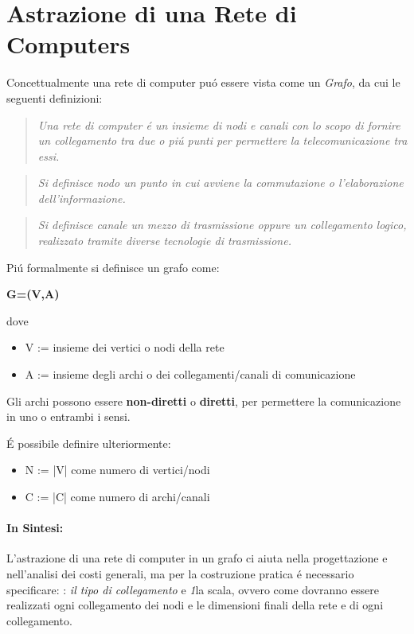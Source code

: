 \documentclass[12pt]{article}
\begin{document}
\clearpage
\section{Astrazione di una Rete di Computers}\label{astrazione-di-una-rete-di-computers}
Concettualmente una rete di computer pu\'o essere vista come un \textit{Grafo}, da cui le seguenti definizioni:
\begin{quote}
	\textit{Una rete di computer \'e un insieme di nodi e canali con lo scopo di fornire un collegamento tra due o pi\'u punti
	per permettere la telecomunicazione tra essi.}
\end{quote}

\begin{quote}
	\textit{Si definisce nodo un punto in cui avviene la commutazione o l'elaborazione dell'informazione.}
\end{quote}

\begin{quote}
	\textit{Si definisce canale un mezzo di trasmissione oppure un collegamento logico, realizzato tramite diverse tecnologie di 
	trasmissione.}
\end{quote}
Pi\'u formalmente si definisce un grafo come:
\begin{center}
	\textbf{G=(V,A)}
\end{center}
dove
\begin{itemize}[noitemsep]
	\item V := insieme dei vertici o nodi della rete
	\item A := insieme degli archi o dei collegamenti/canali di comunicazione
\end{itemize}
Gli archi possono essere \textbf{non-diretti} o \textbf{diretti}, per permettere la comunicazione in uno o entrambi i
sensi. 

\'E possibile definire ulteriormente:
\begin{itemize}[noitemsep]
	\item N := |V| come numero di vertici/nodi
	\item C := |C| come numero di archi/canali 
\end{itemize}

\paragraph{In Sintesi:}
L'astrazione di una rete di computer in un grafo ci aiuta nella progettazione e nell'analisi dei costi generali, ma per la 
costruzione pratica \'e necessario specificare: : \textit{il tipo di collegamento} e \textit1{la scala}, ovvero come 
dovranno essere realizzati ogni collegamento dei nodi e le dimensioni finali della rete e di ogni collegamento.
\end{document}
